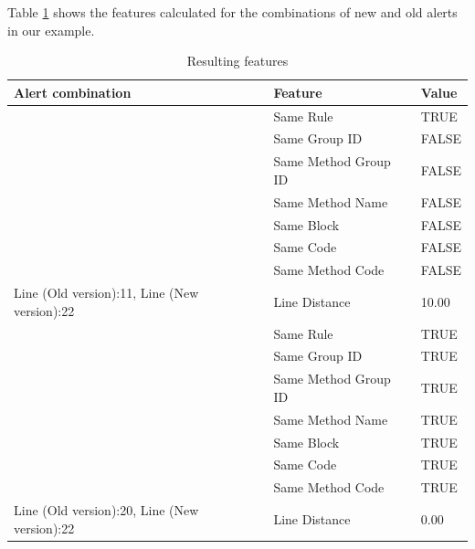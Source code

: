 \documentclass[
]{article}
\begin{document}
\begin{itemize}
\normalsize

Table \ref{table_features} shows the features calculated for the combinations of new and old
alerts in our example.

\small
\begin{table}[H]
\caption{\label{tab:unnamed-chunk-13}Resulting features\label{table_features} }
\centering
\begin{tabular}[t]{l|l|l}
\hline
Alert combination & Feature & Value\\
\hline
\rowcolor{gray!6}  \rowcolor{gray!6}   & Same Rule & TRUE\\

 & Same Group ID & FALSE\\

\rowcolor{gray!6}   & Same Method Group ID & FALSE\\

 & Same Method Name & FALSE\\

\rowcolor{gray!6}   & Same Block & FALSE\\

 & Same Code & FALSE\\

\rowcolor{gray!6}   & Same Method Code & FALSE\\

\multirow[t]{-8}{*}{\raggedright\arraybackslash Line (Old version):11, Line (New version):22} & Line Distance & 10.00\\
\cline{1-3}
 & Same Rule & TRUE\\

 & Same Group ID & TRUE\\

\rowcolor{gray!6}   & Same Method Group ID & TRUE\\

 & Same Method Name & TRUE\\

\rowcolor{gray!6}   & Same Block & TRUE\\

 & Same Code & TRUE\\

\rowcolor{gray!6}   & Same Method Code & TRUE\\

\multirow[t]{-8}{*}{\raggedright\arraybackslash Line (Old version):20, Line (New version):22} & Line Distance & 0.00\\
\hline
\end{tabular}
\end{table}

\end{itemize}
\end{document}
